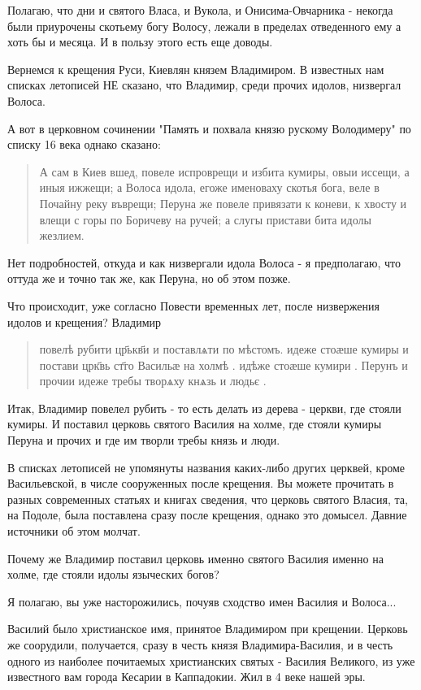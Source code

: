 \documentclass[a5paper,11pt,openany]{article}
\begin{document}
   Полагаю, что дни и святого Власа, и Вукола, и Онисима-Овчарника - некогда были приурочены скотьему богу Волосу, лежали в пределах отведенного ему а хоть бы и месяца. И в пользу этого есть еще доводы.

   Вернемся к крещения Руси, Киевлян князем Владимиром. В известных нам списках летописей НЕ сказано, что Владимир, среди прочих идолов, низвергал Волоса.

   А вот в церковном сочинении "Память и похвала князю рускому Володимеру" по списку 16 века однако сказано:

\begin{quotation}
\noindent А сам в Киев вшед, повеле испроврещи и избита кумиры, овыи иссещи, а иныя ижжещи; а Волоса идола, егоже именоваху скотья бога, веле в Почайну реку въврещи; Перуна же повеле привязати к коневи, к хвосту и влещи с горы по Боричеву на ручей; а слугы пристави бита идолы жезлием.
\end{quotation}

   Нет подробностей, откуда и как низвергали идола Волоса - я предполагаю, что оттуда же и точно так же, как Перуна, но об этом позже.

   Что происходит, уже согласно Повести временных лет, после низвержения идолов и крещения? Владимир 

\begin{quotation}
\noindent повелѣ рубити цр҃ькв҃и и поставлѧти по мѣстомъ.
идеже стоӕше кумиры и постави црк҃вь ст҃го Васильӕ на холмѣ . идѣже стоӕше
кумири . Перунъ и прочии идеже требы творѧху кнѧзь и людьє .
\end{quotation}

Итак, Владимир повелел рубить - то есть делать из дерева - церкви, где стояли кумиры. И поставил церковь святого Василия на холме, где стояли кумиры Перуна и прочих и где им творли требы князь и люди.

   В списках летописей не упомянуты названия каких-либо других церквей, кроме Васильевской, в числе сооруженных после крещения. Вы можете прочитать в разных современных статьях и книгах сведения, что церковь святого Власия, та, на Подоле, была поставлена сразу после крещения, однако это домысел. Давние источники об этом молчат.

   Почему же Владимир поставил церковь именно святого Василия именно на холме, где стояли идолы языческих богов?

   Я полагаю, вы уже насторожились, почуяв сходство имен Василия и Волоса...

   Василий было христианское имя, принятое Владимиром при крещении. Церковь же соорудили, получается, сразу в честь князя Владимира-Василия, и в честь одного из наиболее почитаемых христианских святых - Василия Великого, из уже известного вам города Кесарии в Каппадокии. Жил в 4 веке нашей эры.
\end{document}
